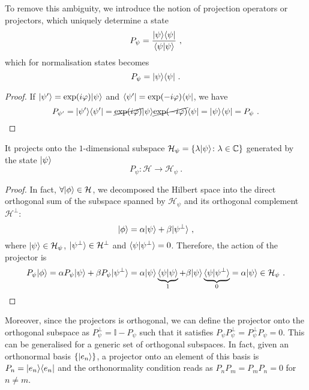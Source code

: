     To remove this ambiguity, we introduce the notion of projection operators or projectors, which uniquely determine a state
    \begin{equation*}
        P_\psi = \frac{\vert\psi\rangle \langle\psi\vert}{\langle\psi\vert\psi\rangle} ~,
    \end{equation*}
    which for normalisation states becomes 
    \begin{equation}\label{proj}
        P_\psi = \vert\psi\rangle \langle\psi\vert ~.
    \end{equation}
    \begin{proof}
        If $\vert\psi'\rangle = \exp(i \varphi) \vert\psi\rangle$ and $\langle\psi'\vert = \exp(- i \varphi) \langle\psi\vert$, we have 
        \begin{equation*}
            P_{\psi'} = \vert\psi'\rangle \langle\psi'\vert = \cancel{\exp(i \varphi)} \vert\psi\rangle \cancel{\exp(- i \varphi)} \langle\psi\vert = \vert\psi\rangle \langle\psi\vert = P_\psi ~.
        \end{equation*}
    \end{proof}

    It projects onto the $1$-dimensional subspace $\mathcal H_\psi = \{\lambda \vert\psi\rangle \colon \lambda \in \mathbb C\}$ generated by the state $\vert\psi\rangle$
    \begin{equation*}
        P_\psi \colon \mathcal H \rightarrow \mathcal H_\psi ~.
    \end{equation*}
    \begin{proof}
        In fact, $\forall \vert\phi\rangle \in \mathcal H$, we decomposed the Hilbert space into the direct orthogonal sum of the subspace spanned by $\mathcal H_{\psi}$ and its orthogonal complement $\mathcal H^\perp$:
        \begin{equation*}
            \vert\phi\rangle = \alpha \vert\psi\rangle + \beta \vert\psi^\perp\rangle ~,
        \end{equation*}
        where $\vert\psi\rangle \in \mathcal H_\psi$, $\vert\psi^\perp\rangle \in \mathcal H^\perp$ and $\langle\psi\vert\psi^\perp\rangle = 0$. Therefore, the action of the projector is
        \begin{equation*}
            P_\psi \vert\phi\rangle = \alpha P_\psi \vert\psi\rangle + \beta P_\psi \vert\psi^\perp\rangle = \alpha \vert\psi\rangle \underbrace{\langle\psi\vert\psi\rangle}_1 + \beta \vert\psi\rangle \underbrace{\langle\psi\vert\psi^\perp\rangle}_0 = \alpha \vert\psi\rangle \in \mathcal H_\psi ~.
        \end{equation*}
    \end{proof}
    Moreover, since the projectors is orthogonal, we can define the  projector onto the orthogonal subspace as $P_\psi^\perp = \mathbb I - P_\psi$ such that it satisfies $P_\psi P_\psi^\perp = P_\psi^\perp P_\psi = 0$. This can be generalised for a generic set of orthogonal subspaces. In fact, given an orthonormal basis $\{\vert e_n\rangle\}$, a projector onto an element of this basis is $P_n = \vert e_n\rangle \langle e_n\vert$ and the orthonormality condition reads as $P_n P_m = P_m P_n = 0$ for $n \neq m$.

